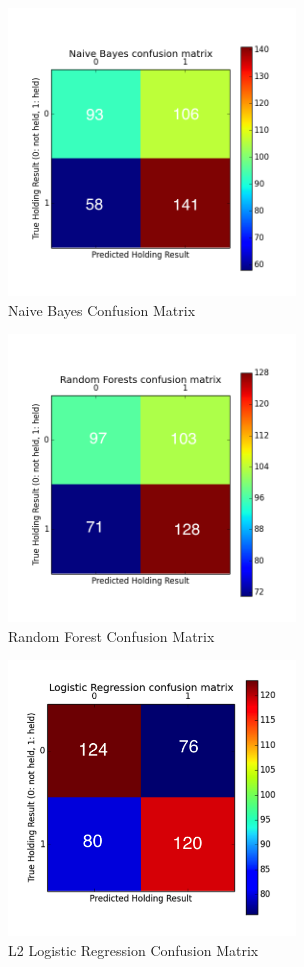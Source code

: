 \documentclass[journal]{IEEEtran}
\begin{document}
\begin{figure}
    \centering
    \includegraphics[width=3in]{nbConfusion.png}
    \caption{Naive Bayes Confusion Matrix}
    \label{fig:nb}
\end{figure}

\begin{figure}
    \centering
    \includegraphics[width=3in]{rfConfusion.png}
    \caption{Random Forest Confusion Matrix}
    \label{fig:rf}
\end{figure}

\begin{figure}
    \centering
    \includegraphics[width=3in]{logregConfusion.png}
    \caption{L2 Logistic Regression Confusion Matrix}
    \label{fig:logReg}
\end{figure}
\end{document}
